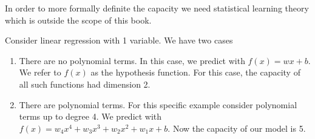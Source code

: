 \begin{remark}
    In order to more formally definite the capacity we need statistical learning theory which is outside the scope of this book.
\end{remark}

\begin{example}
    Consider linear regression with 1 variable. We have two cases
    \begin{enumerate}
        \item There are no polynomial terms. In this case, we predict with $f(x)=wx+b$. We refer to $f(x)$ as the hypothesis function. For this case, the capacity of all such functions had dimension 2.
        \item There are polynomial terms. For this specific example consider polynomial terms up to degree 4. We predict with $f(x)=w_4x^4+w_3x^3+w_2x^2+w_1x+b$. Now the capacity of our model is 5.
    \end{enumerate}
\end{example}

